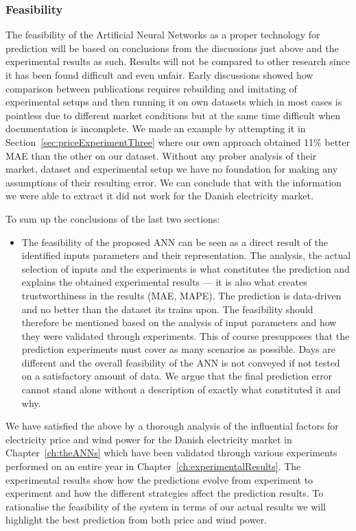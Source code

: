 \subsubsection{Feasibility}
The feasibility of the Artificial Neural Networks as a proper technology for prediction will be based on conclusions from the discussions just above and the experimental results as such. Results will not be compared to other research since it has been found difficult and even unfair. Early discussions showed how comparison between publications requires rebuilding and imitating of experimental setups and then running it on own datasets which in most cases is pointless due to different market conditions but at the same time difficult when documentation is incomplete. We made an example by attempting it in Section~\ref{sec:priceExperimentThree} where our own approach obtained 11\% better MAE than the other on our dataset. Without any prober analysis of their market, dataset and experimental setup we have no foundation for making any assumptions of their resulting error. We can conclude that with the information we were able to extract it did not work for the Danish electricity market. 

To sum up the conclusions of the last two sections:

\begin{itemize}
\item The feasibility of the proposed ANN can be seen as a direct result of the identified inputs parameters and their representation. The analysis, the actual selection of inputs and the experiments is what constitutes the prediction and explains the obtained experimental results --- it is also what creates trustworthiness in the results (MAE, MAPE). The prediction is data-driven and no better than the dataset its trains upon. The feasibility should therefore be mentioned based on the analysis of input parameters and how they were validated through experiments. This of course presupposes that the prediction experiments must cover as many scenarios as possible. Days are different and the overall feasibility of the ANN is not conveyed if not tested on a satisfactory amount of data. We argue that the final prediction error cannot stand alone without a description of exactly what constituted it and why.
\end{itemize}

We have satisfied the above by a thorough analysis of the influential factors for electricity price and wind power for the Danish electricity market in Chapter~\ref{ch:theANNs} which have been validated through various experiments performed on an entire year in Chapter~\ref{ch:experimentalResults}. The experimental results show how the predictions evolve from experiment to experiment and how the different strategies affect the prediction results. To rationalise the feasibility of the system in terms of our actual results we will highlight the best prediction from both price and wind power.

